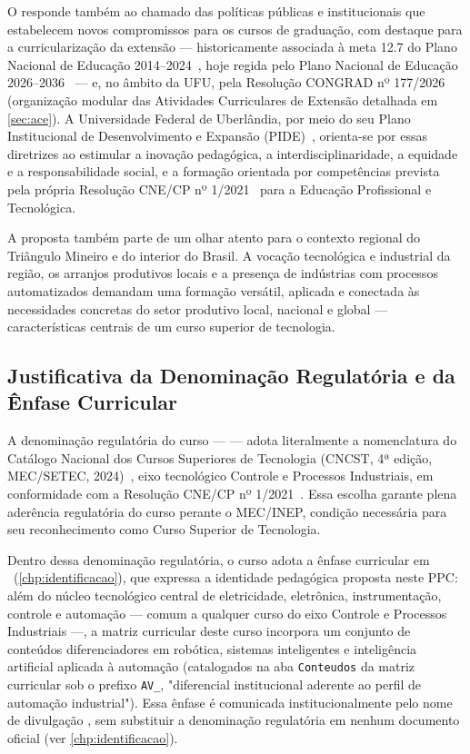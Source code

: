 O \ppccurso responde também ao chamado das políticas públicas e institucionais que estabelecem novos compromissos para os cursos de graduação, com destaque para a curricularização da extensão — historicamente associada à meta 12.7 do Plano Nacional de Educação 2014--2024~\cite{mec_pne_2014}, hoje regida pelo Plano Nacional de Educação 2026--2036~\cite{mec_pne_2026} — e, no âmbito da UFU, pela Resolução CONGRAD nº 177/2026~\cite{ufu_congrad_177_2026} (organização modular das Atividades Curriculares de Extensão detalhada em \autoref{sec:ace}). A Universidade Federal de Uberlândia, por meio do seu Plano Institucional de Desenvolvimento e Expansão (PIDE)~\cite{ufu_consun_31_2022}, orienta-se por essas diretrizes ao estimular a inovação pedagógica, a interdisciplinaridade, a equidade e a responsabilidade social, e a formação orientada por competências prevista pela própria Resolução CNE/CP nº 1/2021~\cite{cne_cp_1_2021} para a Educação Profissional e Tecnológica.

A proposta também parte de um olhar atento para o contexto regional do Triângulo Mineiro e do interior do Brasil. A vocação tecnológica e industrial da região, os arranjos produtivos locais e a presença de indústrias com processos automatizados demandam uma formação versátil, aplicada e conectada às necessidades concretas do setor produtivo local, nacional e global — características centrais de um curso superior de tecnologia.

\subsection{Justificativa da Denominação Regulatória e da Ênfase Curricular}

A denominação regulatória do curso — \ppccurso — adota literalmente a nomenclatura do Catálogo Nacional dos Cursos Superiores de Tecnologia (CNCST, 4ª edição, MEC/SETEC, 2024)~\cite{mec_cncst_2024}, eixo tecnológico Controle e Processos Industriais, em conformidade com a Resolução CNE/CP nº 1/2021~\cite{cne_cp_1_2021}. Essa escolha garante plena aderência regulatória do curso perante o MEC/INEP, condição necessária para seu reconhecimento como Curso Superior de Tecnologia.

Dentro dessa denominação regulatória, o curso adota a ênfase curricular em \ppcenfasecurricular\ (\autoref{chp:identificacao}), que expressa a identidade pedagógica proposta neste PPC: além do núcleo tecnológico central de eletricidade, eletrônica, instrumentação, controle e automação — comum a qualquer curso do eixo Controle e Processos Industriais —, a matriz curricular deste curso incorpora um conjunto de conteúdos diferenciadores em robótica, sistemas inteligentes e inteligência artificial aplicada à automação (catalogados na aba \texttt{Conteudos} da matriz curricular sob o prefixo \texttt{AV\_}, "diferencial institucional aderente ao perfil de automação industrial"). Essa ênfase é comunicada institucionalmente pelo nome de divulgação \ppccursomercadologico, sem substituir a denominação regulatória em nenhum documento oficial (ver \autoref{chp:identificacao}).

